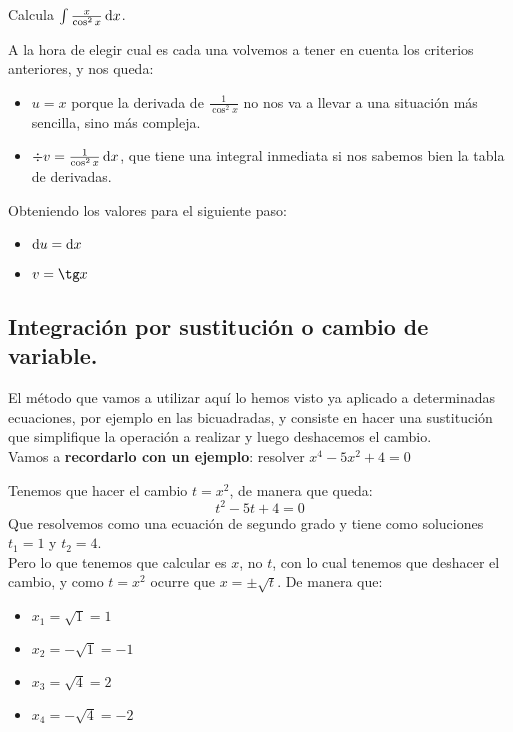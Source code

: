 \documentclass[a4paper,11pt,answers]{exam}
\begin{document}
\begin{questions}
\question Calcula $\int \frac{x}{\cos^2 x}\,\mathrm{d}x$.
\begin{solution}
A la hora de elegir cual es cada una volvemos a tener en cuenta los criterios anteriores, y nos queda:
\begin{itemize}
	\item $u = x$ porque la derivada de $\frac{1}{\cos^2 x}$ no nos va a llevar a una situación más sencilla, sino más compleja.
	\item $\div{v} = \frac{1}{\cos^2 x}\,\mathrm{d}x$, que tiene una integral inmediata si nos sabemos bien la tabla de derivadas.
\end{itemize}
Obteniendo los valores para el siguiente paso:
\begin{itemize}
	\item $\mathrm{d}u = \mathrm{d}x$
	\item $v = \tg x$
\end{itemize}
\end{solution}
\end{questions}
\subsection{Integración por sustitución o cambio de variable.}
El método que vamos a utilizar aquí lo hemos visto ya aplicado a determinadas ecuaciones, por ejemplo en las bicuadradas, y consiste en hacer una sustitución que simplifique la operación a realizar y luego deshacemos el cambio.\\
Vamos a \textbf{recordarlo con un ejemplo}: resolver $x^4 - 5x^2 + 4 = 0$
\begin{solution}
Tenemos que hacer el cambio $t = x^2$, de manera que queda:
\[t^2 - 5t + 4 = 0\]
Que resolvemos como una ecuación de segundo grado y tiene como soluciones $t_1 = 1$ y $t_2 = 4$.\\
Pero lo que tenemos que calcular es $x$, no $t$, con lo cual tenemos que deshacer el cambio, y como $t=x^2$ ocurre que $x = \pm \sqrt{t}$. De manera que:
\begin{itemize}
	\item $x_1 = \sqrt{1} = 1$
	\item $x_2 = -\sqrt{1} = -1$
	\item $x_3 = \sqrt{4} = 2$
	\item $x_4 = -\sqrt{4} = -2$
\end{itemize}
\end{solution}
\end{document}
